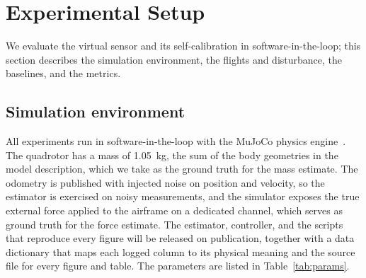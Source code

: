 \documentclass[lettersize,journal]{IEEEtran}
\begin{document}
\section{Experimental Setup}\label{sec:setup}

We evaluate the virtual sensor and its self-calibration in software-in-the-loop;
this section describes the simulation environment, the flights and disturbance, the
baselines, and the metrics.

\subsection{Simulation environment}
All experiments run in software-in-the-loop with the MuJoCo physics
engine~\cite{todorov2012mujoco}. The quadrotor has a mass of \SI{1.05}{\kilogram},
the sum of the body geometries in the model description, which we take as the
ground truth for the mass estimate. The odometry is published with injected
noise on position and velocity, so the estimator is exercised on noisy
measurements, and
the simulator exposes the true external force applied to the airframe on a
dedicated channel, which serves as ground truth for the force estimate. The
estimator, controller, and the scripts that reproduce every figure will be
released on publication, together with a data dictionary that maps each logged
column to its physical meaning and the source file for every figure and table. The
parameters are listed in Table~\ref{tab:params}.
\end{document}
